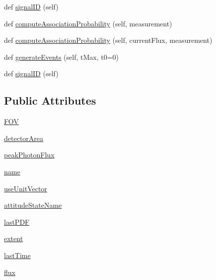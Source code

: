\begin{DoxyCompactItemize}
\item 
def \hyperlink{classmodest_1_1signals_1_1signalsource_1_1SignalSource_a9a64c6a9c2954f6ad61e4ca3518ea8ab}{signal\+ID} (self)
\item 
def \hyperlink{classmodest_1_1signals_1_1poissonsource_1_1StaticPoissonSource_a1754d94bff46d97817438bab552afef9}{compute\+Association\+Probability} (self, measurement)
\item 
def \hyperlink{classmodest_1_1signals_1_1poissonsource_1_1PoissonSource_a2f8a73e6f51cbdcd0f1e646d6f4d4574}{compute\+Association\+Probability} (self, current\+Flux, measurement)
\item 
def \hyperlink{classmodest_1_1signals_1_1poissonsource_1_1StaticPoissonSource_acc0f087c93d5e90070f4cd0be95ace74}{generate\+Events} (self, t\+Max, t0=0)
\item 
def \hyperlink{classmodest_1_1signals_1_1signalsource_1_1SignalSource_a9a64c6a9c2954f6ad61e4ca3518ea8ab}{signal\+ID} (self)
\end{DoxyCompactItemize}
\subsection*{Public Attributes}
\begin{DoxyCompactItemize}
\item 
\hyperlink{classmodest_1_1signals_1_1staticxraypointsource_1_1StaticXRayPointSource_acecc2d36638c023070193dcb64c8a554}{F\+OV}
\item 
\hyperlink{classmodest_1_1signals_1_1staticxraypointsource_1_1StaticXRayPointSource_a3229134704add2350e5090b2337583f9}{detector\+Area}
\item 
\hyperlink{classmodest_1_1signals_1_1staticxraypointsource_1_1StaticXRayPointSource_a695992505d7f10fb7d44a7d0f7c6061e}{peak\+Photon\+Flux}
\item 
\hyperlink{classmodest_1_1signals_1_1staticxraypointsource_1_1StaticXRayPointSource_adf18ce1f6cf286238d5ae52bd9d3978c}{name}
\item 
\hyperlink{classmodest_1_1signals_1_1pointsource_1_1PointSource_ac2dd52c4e1f7e6264c9d59a5ffbc43d1}{use\+Unit\+Vector}
\item 
\hyperlink{classmodest_1_1signals_1_1pointsource_1_1PointSource_a0924a2233bb4fd23e50d024e4f1b048e}{attitude\+State\+Name}
\item 
\hyperlink{classmodest_1_1signals_1_1pointsource_1_1PointSource_afde4a069238f53aaa11fbc54584b7a64}{last\+P\+DF}
\item 
\hyperlink{classmodest_1_1signals_1_1pointsource_1_1PointSource_a984b5a75c9e94cb3527707b9ac976f9e}{extent}
\item 
\hyperlink{classmodest_1_1signals_1_1poissonsource_1_1PoissonSource_a34395fc83bd8743a0a5ee69f9392a606}{last\+Time}
\item 
\hyperlink{classmodest_1_1signals_1_1poissonsource_1_1PoissonSource_a6f2c657ad936b921715d826ac74f7fe5}{flux}
\end{DoxyCompactItemize}
